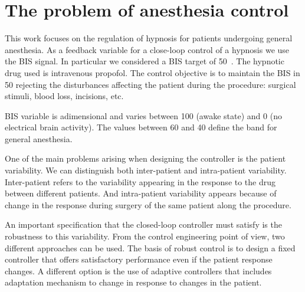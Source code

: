 \section{The problem of anesthesia control}
This work focuses on the regulation of hypnosis for patients undergoing general anesthesia.
As a feedback variable for a close-loop control of a hypnosis we use the BIS signal.
%
In particular we considered a BIS target of 50~\cite{luginbuhl,rampil}.
%
The hypnotic drug used is intravenous propofol.
%
The control objective is to maintain the BIS in 50 rejecting the disturbances affecting
the patient during the procedure: surgical stimuli, blood loss, incisions, etc.

%
BIS variable is adimensional and varies between 100 (awake state) and 0 (no electrical brain activity).
%
%
The values between 60 and 40 define the band for general anesthesia.
%

One of the main problems arising when designing the controller is
the patient variability.
%
We can distinguish both inter-patient and intra-patient
variability. Inter-patient refers to the variability appearing in the
response to the drug between different patients.
%
And intra-patient variability appears because of change in the
response during surgery of the same patient along the procedure.

An important specification that the closed-loop controller must
satisfy is the robustness to this variability.
%
From the control engineering point of view, two different approaches
can be used.
%
The basis of robust control is to design a fixed controller that
offers satisfactory performance even if the patient response
changes.
%
A different option is the use of adaptive controllers that includes
adaptation mechanism to change in response to changes in the patient.

